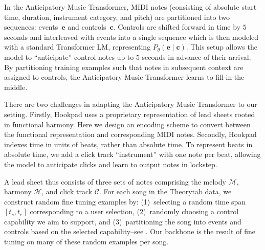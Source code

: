 \documentclass{article}
\newcommand\hookpad{Hookpad}
\begin{document}
In the Anticipatory Music Transformer,
MIDI notes (consisting of absolute start time, duration, instrument category, and pitch) 
are partitioned into two sequences:
events~$\mathbf{e}$ and controls~$\mathbf{c}$. 
Controls are shifted forward in time by $5$ seconds and interleaved with events into a single sequence which is then modeled with a standard Transformer LM, representing ${P_{\theta}(\mathbf{e} \mid \mathbf{c})}$. 
This setup allows the model to ``anticipate'' control notes up to $5$ seconds in advance of their arrival. 
By partitioning training examples such that notes in subsequent context are assigned to controls, 
the Anticipatory Music Transformer learns to fill-in-the-middle. 



There are two challenges in adapting the Anticipatory Music Transformer to our setting. 
Firstly, \hookpad{} uses a proprietary representation of lead sheets rooted in functional harmony. 
Here we design an encoding scheme to convert between the functional representation and corresponding MIDI notes. 
Secondly, \hookpad{} indexes time in units of beats, rather than absolute time. 
To represent beats in absolute time, 
we add a click track ``instrument'' with one note per beat, 
allowing the model to anticipate clicks and learn to output notes in lockstep.  

A lead sheet thus consists of three sets of notes comprising the melody $\mathcal{M}$, harmony $\mathcal{H}$, and click track $\mathcal{C}$. 
For each song in the Theorytab data, 
we construct random fine tuning examples by:
(1)~selecting a random time span $[t_s, t_e]$ corresponding to a user selection,
(2)~randomly choosing a control capability we aim to support, and
(3)~partitioning the song into events and controls based on the selected capability--see . 
Our backbone is the result of fine tuning on many of these random examples per song.
\end{document}
